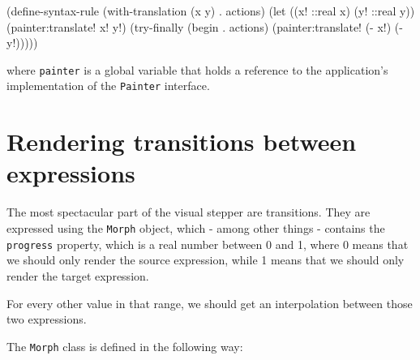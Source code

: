\documentclass[acmsmall]{acmart}
\newenvironment{Snippet}{\Verbatim[samepage=true]}{\endVerbatim}
\begin{document}
\begin{Snippet}
(define-syntax-rule (with-translation (x y)
		      . actions)
  (let ((x! ::real x)
        (y! ::real y))
    (painter:translate! x! y!)
    (try-finally
     (begin . actions)
     (painter:translate! (- x!) (- y!)))))
\end{Snippet}

where \texttt{painter} is a global variable that holds a reference
to the application's implementation of the \texttt{Painter} interface.


\section{Rendering transitions between expressions}

The most spectacular part of the visual stepper are transitions. They
are expressed using the \texttt{Morph} object, which - among other
things - contains the \texttt{progress} property, which is a real
number between 0 and 1, where 0 means that we should only render the
source expression, while 1 means that we should only render the target
expression.

For every other value in that range, we should get an interpolation
between those two expressions.

The \texttt{Morph} class is defined in the following way:
\end{document}
